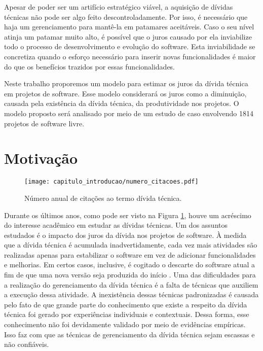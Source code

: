 Apesar de poder ser um artifício estratégico viável, a aquisição de dívidas técnicas não pode ser algo feito descontroladamente. Por isso, é necessário que haja um gerenciamento para mantê-la em patamares aceitáveis.  Caso o seu nível atinja um patamar muito alto, é possível que o juros causado por ela inviabilize todo o processo de desenvolvimento e evolução do software. Esta inviabilidade se concretiza quando o esforço necessário para inserir novas funcionalidades é maior do que os benefícios trazidos por essas funcionalidades.

Neste trabalho proporemos um modelo para estimar os juros da dívida técnica em projetos de software. Esse modelo considerará os juros como a diminuição, causada pela existência da dívida técnica, da produtividade nos projetos. O modelo proposto será analisado por meio de um estudo de caso envolvendo 1814 projetos de software livre.


\section{Motivação}


  \begin{figure}[H]
  \centering
  \texttt{[image: capitulo\_introducao/numero\_citacoes.pdf]} 
  \caption{Número anual de citações ao termo dívida técnica. }
  \label{fig:cap1_citacoes_td_ano} 
\end{figure}

Durante os últimos anos, como pode ser visto na Figura \ref{fig:cap1_citacoes_td_ano}, houve um acréscimo do interesse acadêmico em estudar as dívidas técnicas. Um dos assuntos estudados é o impacto dos juros da dívida nos projetos de software\cite{zazworka2011investigating,power2013understanding}. À medida que a dívida técnica é acumulada inadvertidamente,  cada vez mais atividades são realizadas apenas para estabilizar o software em vez de adicionar funcionalidades e melhorias. Em certos casos, inclusive, é cogitado o descarte do software atual a fim de que uma nova versão seja produzida do início \cite{sterling2010managing}. Uma das dificuldades para a realização do gerenciamento da dívida técnica é a falta de técnicas que auxiliem a execução dessa atividade. A inexistência dessas técnicas padronizadas é causada pelo fato de que grande parte do conhecimento que existe a respeito da dívida técnica foi gerado por experiências individuais e contextuais. Dessa forma, esse conhecimento não foi devidamente validado por meio de evidências empíricas. Isso faz com que as técnicas de gerenciamento  da dívida técnica sejam escassas e não confiáveis\cite{brown2010managing}. 

